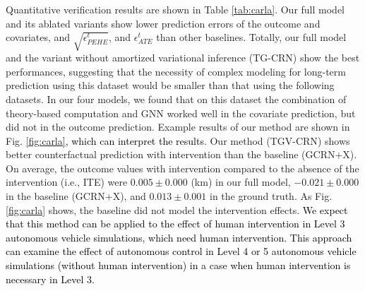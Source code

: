 \documentclass[journal]{IEEEtran}
\newcommand{\model}{{TGV-CRN}\xspace}
\begin{document}
Quantitative verification results are shown in Table \ref{tab:carla}.
Our full model and its ablated variants show lower prediction errors of the outcome and covariates, and $\sqrt{\epsilon^t_{PEHE}}$, and $\epsilon^t_{ATE}$ than other baselines. 
Totally, our full model and the variant without amortized variational inference (TG-CRN) show the best performances, suggesting that the necessity of complex modeling for long-term prediction using this dataset would be smaller than that using the following datasets. 
In our four models, we found that on this dataset the combination of theory-based computation and GNN worked well in the covariate prediction, but did not in the outcome prediction.  
Example results of our method are shown in Fig. \ref{fig:carla}\textcolor{black}{, which can interpret the results}.
Our method (\model) shows better counterfactual prediction with intervention than the baseline (GCRN$+$X).
On average, the outcome values with intervention compared to the absence of the intervention (i.e., ITE) were $0.005 \pm 0.000$ (km) in our full model, $-0.021 \pm 0.000$ in the baseline (GCRN+X), and $0.013 \pm 0.001$ in the ground truth.
As Fig. \ref{fig:carla} shows, the baseline did not model the intervention effects.
\textcolor{black}{We expect that this method can be applied to the effect of human intervention in Level 3 autonomous vehicle simulations, which need human intervention. This approach can examine the effect of autonomous control in Level 4 or 5 autonomous vehicle simulations (without human intervention) in a case when human intervention is necessary in Level 3.}
\end{document}
